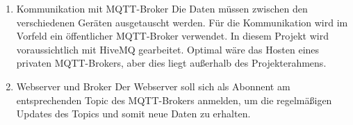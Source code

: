 \begin{enumerate}
	\item Kommunikation mit MQTT-Broker \newline
	Die Daten müssen zwischen den verschiedenen Geräten ausgetauscht werden. Für die Kommunikation wird im Vorfeld ein öffentlicher MQTT-Broker verwendet. In diesem Projekt wird voraussichtlich mit HiveMQ gearbeitet. Optimal wäre das Hosten eines privaten MQTT-Brokers, aber dies liegt außerhalb des Projekterahmens.
	
	\item Webserver und Broker \newline
	Der Webserver soll sich als Abonnent am entsprechenden Topic des MQTT-Brokers anmelden, um die regelmäßigen Updates des Topics und somit neue Daten zu erhalten.
\end{enumerate}